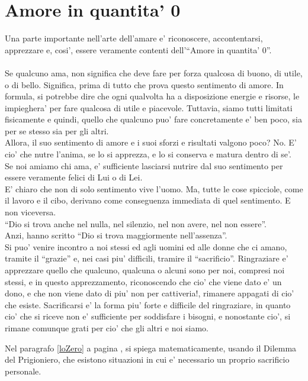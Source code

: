 \section{Amore in quantita' 0}

Una parte importante nell'arte dell'amare e' riconoscere, accontentarsi, apprezzare e, cosi', essere veramente contenti dell'``Amore in quantita' 0''.\\
\leavevmode\\
Se qualcuno ama, non significa che deve fare per forza qualcosa di buono, di utile, o di bello. Significa, prima di tutto che prova questo sentimento di amore. In formula, si potrebbe dire che ogni qualvolta ha a disposizione energie e risorse, le impieghera' per fare qualcosa di utile e piacevole. Tuttavia, siamo tutti limitati fisicamente e quindi, quello che qualcuno puo' fare concretamente e' ben poco, sia per se stesso sia per gli altri.\\
Allora, il suo sentimento di amore e i suoi sforzi e risultati valgono poco? No. E' cio' che nutre l'anima, se lo si apprezza, e lo si conserva e matura dentro di se'.\\

Se noi amiamo chi ama, e' sufficiente lasciarsi nutrire dal suo sentimento per essere veramente felici di Lui o di Lei.\\
E' chiaro che non di solo sentimento vive l'uomo. Ma, tutte le cose spicciole, come il lavoro e il cibo, derivano come conseguenza immediata di quel sentimento. E non viceversa.\\

``Dio si trova anche nel nulla, nel silenzio, nel non avere, nel non essere''.\\
Anzi, hanno scritto ``Dio si trova maggiormente nell'assenza''.\\

Si puo' venire incontro a noi stessi ed agli uomini ed alle donne che ci amano, tramite il ``grazie'' e, nei casi piu' difficili, tramire il ``sacrificio''. Ringraziare e' apprezzare quello che qualcuno, qualcuna o alcuni sono per noi, compresi noi stessi, e in questo apprezzamento, riconoscendo che cio' che viene dato e' un dono, e che non viene dato di piu' non per cattiveria!, rimanere appagati di cio' che esiste. Sacrificarsi e' la forma piu' forte e difficile del ringraziare, in quanto cio' che si riceve non e' sufficiente per soddisfare i bisogni, e nonostante cio', si rimane comunque grati per cio' che gli altri e noi siamo. 

Nel paragrafo \ref{loZero} a pagina \pageref{loZero}, si spiega matematicamente, usando il Dilemma del Prigioniero, che esistono situazioni in cui e' necessario un proprio sacrificio personale.

